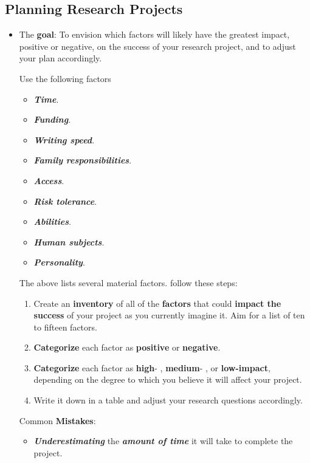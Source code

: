 \documentclass[11pt]{article}
\begin{document}
\subsection{Planning Research Projects}
\begin{itemize}
\item \begin{exercise}

The \textbf{goal}: To envision which factors will likely have the greatest impact, positive or negative, on the success of your research project, and to adjust your plan accordingly. 

Use the following factors
\begin{itemize}
\item \emph{\textbf{Time}}. 

\item \emph{\textbf{Funding}}.

\item \emph{\textbf{Writing speed}}. 

\item \emph{\textbf{Family responsibilities}}. 

\item \emph{\textbf{Access}}. 

\item \emph{\textbf{Risk tolerance}}.

\item \emph{\textbf{Abilities}}. 

\item \emph{\textbf{Human subjects}}.

\item \emph{\textbf{Personality}}.
\end{itemize}The above lists several material factors. follow these steps:
\begin{enumerate}
\item Create an \textbf{inventory} of all of the \textbf{factors} that could \textbf{impact the success} of your project as you currently imagine it. Aim for a list of ten to fifteen factors.

\item \textbf{Categorize} each factor as \textbf{positive} or \textbf{negative}.

\item \textbf{Categorize} each factor as \textbf{high}- , \textbf{medium}- , or \textbf{low-impact}, depending on the degree to which you believe it will affect your project.

\item Write it down in a table and adjust your research questions accordingly.
\end{enumerate} 
\end{exercise}
Common \textbf{Mistakes}:
\begin{itemize}
\item \emph{\textbf{Underestimating}} the \emph{\textbf{amount of time}} it will take to complete the project.


\end{itemize}
\end{itemize}
\end{document}
